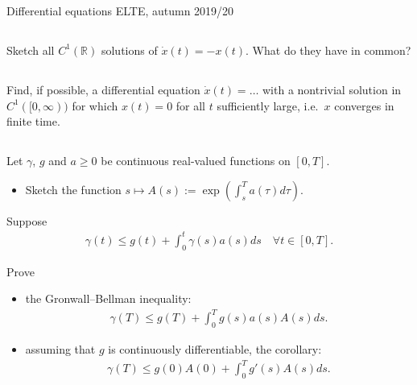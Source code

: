 \documentclass[12pt,a4paper]{article}
\begin{document}
    Differential equations
    \hfill
    ELTE, autumn 2019/20
    
    
    \subsection{}
    
    Sketch all $C^1(\mathbb{R})$ solutions 
    of $\dot{x}(t) = -x(t)$.
    What do they have in common?
    
    
    \subsection{}
    
    Find, if possible,
    a differential equation $\dot{x}(t) = \ldots$
    with a nontrivial solution in $C^1([0, \infty))$
    for which
    $x(t) = 0$ for all $t$ sufficiently large, 
    i.e.~$x$ converges in finite time.
    
    
    
    \subsection{}
    
    
    Let $\gamma$, $g$ and $a \geq 0$ be continuous real-valued
    functions on $[0, T]$.
    
    \begin{itemize}
    \item
        Sketch 
        the function
        $
            s \mapsto A(s) :=
            \exp( \int_s^T a(\tau) d\tau )
        $.
    \end{itemize}
    
    Suppose 
    \begin{align}
        \gamma(t) 
        \leq 
        g(t) +
        \int_0^t \gamma(s) a(s) ds
        \quad
        \forall t \in [0, T]
        .
    \end{align}

    
    Prove
    
    \begin{itemize}
    \item 
        the Gronwall--Bellman inequality:
        \begin{align}
            \gamma(T) 
            \leq
            g(T) +
            \int_0^T g(s) a(s) A(s) ds
            .
        \end{align}
    \item
        assuming that $g$ is continuously differentiable,
        the corollary:
        \begin{align}
            \gamma(T) 
            \leq 
            g(0) A(0)
            +
            \int_0^T g'(s) A(s) ds
            .
        \end{align}
    \end{itemize}
        
\end{document}
